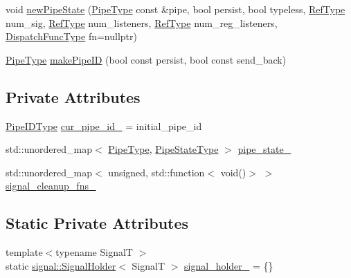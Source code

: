 \begin{DoxyCompactItemize}
\item 
void \hyperlink{structvt_1_1pipe_1_1_pipe_manager_base_a458f8135ed2a44ec51afb21676c5db50}{new\+Pipe\+State} (\hyperlink{namespacevt_ac9852acda74d1896f48f406cd72c7bd3}{Pipe\+Type} const \&pipe, bool persist, bool typeless, \hyperlink{namespacevt_a9b39ce9494bb04674d0d5b895a5aa50f}{Ref\+Type} num\+\_\+sig, \hyperlink{namespacevt_a9b39ce9494bb04674d0d5b895a5aa50f}{Ref\+Type} num\+\_\+listeners, \hyperlink{namespacevt_a9b39ce9494bb04674d0d5b895a5aa50f}{Ref\+Type} num\+\_\+reg\+\_\+listeners, \hyperlink{structvt_1_1pipe_1_1_pipe_manager_base_a983e301505317c5ba2041461e7dec84a}{Dispatch\+Func\+Type} fn=nullptr)
\item 
\hyperlink{namespacevt_ac9852acda74d1896f48f406cd72c7bd3}{Pipe\+Type} \hyperlink{structvt_1_1pipe_1_1_pipe_manager_base_af1ba11407837cb69b4d205dd7ba880b0}{make\+Pipe\+ID} (bool const persist, bool const send\+\_\+back)
\end{DoxyCompactItemize}
\subsection*{Private Attributes}
\begin{DoxyCompactItemize}
\item 
\hyperlink{namespacevt_1_1pipe_a8aa7908de242917ac0922b9e9c85fea4}{Pipe\+I\+D\+Type} \hyperlink{structvt_1_1pipe_1_1_pipe_manager_base_a32f19829aa6cfffde5820b927fc326c9}{cur\+\_\+pipe\+\_\+id\+\_\+} = initial\+\_\+pipe\+\_\+id
\item 
std\+::unordered\+\_\+map$<$ \hyperlink{namespacevt_ac9852acda74d1896f48f406cd72c7bd3}{Pipe\+Type}, \hyperlink{structvt_1_1pipe_1_1_pipe_manager_base_a1364798bda487c9fb04879599f96c507}{Pipe\+State\+Type} $>$ \hyperlink{structvt_1_1pipe_1_1_pipe_manager_base_ab75d5e22880b1bb14a459fdb1147a0e6}{pipe\+\_\+state\+\_\+}
\item 
std\+::unordered\+\_\+map$<$ unsigned, std\+::function$<$ void()$>$ $>$ \hyperlink{structvt_1_1pipe_1_1_pipe_manager_base_a911580408d9a2425c5c8cef0b5002612}{signal\+\_\+cleanup\+\_\+fns\+\_\+}
\end{DoxyCompactItemize}
\subsection*{Static Private Attributes}
\begin{DoxyCompactItemize}
\item 
{\footnotesize template$<$typename SignalT $>$ }\\static \hyperlink{structvt_1_1pipe_1_1signal_1_1_signal_holder}{signal\+::\+Signal\+Holder}$<$ SignalT $>$ \hyperlink{structvt_1_1pipe_1_1_pipe_manager_base_a0c85d01e4f6a9bd90056a8745b255c6d}{signal\+\_\+holder\+\_\+} = \{\}
\end{DoxyCompactItemize}
